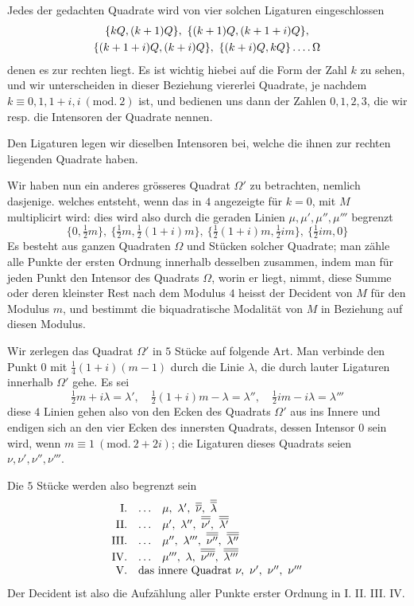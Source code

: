 Jedes der gedachten Quadrate wird von vier solchen Ligaturen einge\-schlossen
\[
\begin{gathered}
\{kQ,(k+1)Q\},\ \{(k+1)Q,(k+1+i)Q\},\\
\{(k+1+i)Q,(k+i)Q\},\ \{(k+i)Q,kQ\}\mathinner{.\,.\,.\,.}\Omega
\end{gathered}
\]
denen es zur rechten liegt. Es ist wichtig hiebei auf die Form der Zahl $k$ zu sehen, und wir unterscheiden in dieser Beziehung viererlei Quadrate, je nachdem $k\equiv0,1,1+i,i\ (\mathrm{mod.}\ 2)$ ist, und bedienen uns dann der Zahlen $0,1,2,3$, die wir resp. die Intensoren der Quadrate nennen.

Den Ligaturen legen wir dieselben Intensoren bei, welche die ihnen zur rechten liegenden Quadrate haben.

Wir haben nun ein anderes grösseres Quadrat $\Omega'$ zu betrachten, nemlich dasjenige. welches entsteht, wenn das in $4$ angezeigte für $k=0$, mit $M$ multiplicirt wird: dies wird also durch die geraden Linien $\mu,\mu',\mu'',\mu'''$ begrenzt
\[
\{0,\tfrac12m\},\ \{\tfrac12m,\tfrac12(1+i)m\},\ \{\tfrac12(1+i)m,\tfrac12im\},\ \{\tfrac12im,0\}
\]
Es besteht aus ganzen Quadraten $\Omega$ und Stücken solcher Quadrate; man zähle
%
alle Punkte der ersten Ordnung innerhalb desselben zusammen, indem man für jeden Punkt den Intensor des Quadrats $\Omega$, worin er liegt, nimmt, diese Summe oder deren kleinster Rest nach dem Modulus $4$ heisst der Decident von $M$ für den Modulus $m$, und bestimmt die biquadratische Modalität von $M$ in Beziehung auf diesen Modulus.

Wir zerlegen das Quadrat $\Omega'$ in $5$ Stücke auf folgende Art. Man verbinde den Punkt $0$ mit $\frac14(1+i)(m-1)$ durch die Linie $\lambda$, die durch lauter Ligaturen innerhalb $\Omega'$ gehe. Es sei
\[
\tfrac12m+i\lambda=\lambda',\quad\tfrac12(1+i)m-\lambda=\lambda'',\quad\tfrac12im-i\lambda=\lambda'''
\]
diese $4$ Linien gehen also von den Ecken des Quadrats $\Omega'$ aus ins Innere und endigen sich an den vier Ecken des innersten Quadrats, dessen Intensor $0$ sein wird, wenn $m\equiv1\ (\mathrm{mod.}\ 2+2i)$; die Ligaturen dieses Quadrats seien $\nu,\nu',\nu'',\nu'''$.

Die $5$ Stücke werden also begrenzt sein
\[
\begin{array}{rll}
\mathrm{I}.&\ldots&\mu,\ \lambda',\ \overline{\overline\nu},\ \overline{\overline\lambda}\\
\mathrm{II}.&\ldots&\mu',\ \lambda'',\ \overline{\overline{\nu'}},\ \overline{\overline{\lambda'}}\\
\mathrm{III}.&\ldots&\mu'',\ \lambda''',\ \overline{\overline{\nu''}},\ \overline{\overline{\lambda''}}\\
\mathrm{IV}.&\ldots&\mu''',\ \lambda,\ \overline{\overline{\nu'''}},\ \overline{\overline{\lambda'''}}\\
\mathrm{V}.&\multicolumn{2}{l}{\text{das innere Quadrat }\nu,\ \nu',\ \nu'',\ \nu'''}
\end{array}
\]
Der Decident ist also die Aufzählung aller Punkte erster Ordnung in I. II. III. IV.

